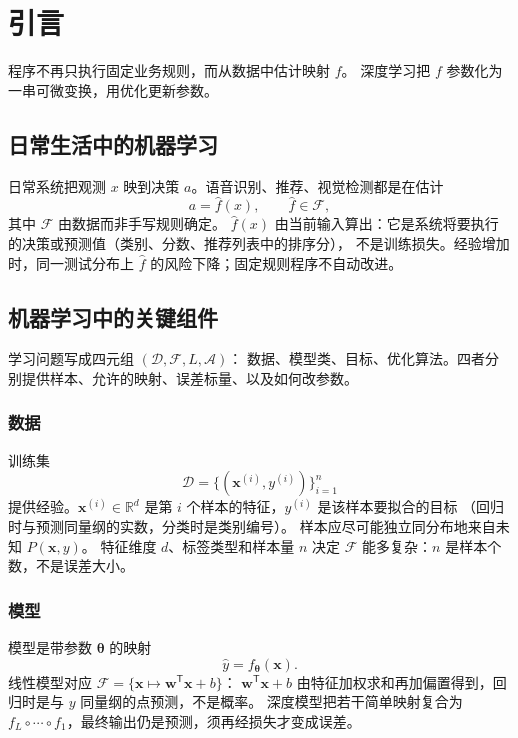 \chapter{引言}

程序不再只执行固定业务规则，而从数据中估计映射 $f$。
深度学习把 $f$ 参数化为一串可微变换，用优化更新参数。

\section{日常生活中的机器学习}

日常系统把观测 $x$ 映到决策 $a$。语音识别、推荐、视觉检测都是在估计
\[
a=\hat{f}(x),\qquad \hat{f}\in\mathcal{F},
\]
其中 $\mathcal{F}$ 由数据而非手写规则确定。
$\hat{f}(x)$ 由当前输入算出：它是系统将要执行的决策或预测值（类别、分数、推荐列表中的排序分），
不是训练损失。经验增加时，同一测试分布上 $\hat{f}$ 的风险下降；固定规则程序不自动改进。

\section{机器学习中的关键组件}

学习问题写成四元组 $(\mathcal{D},\mathcal{F},L,\mathcal{A})$：
数据、模型类、目标、优化算法。四者分别提供样本、允许的映射、误差标量、以及如何改参数。

\subsection{数据}

训练集
\[
\mathcal{D}=\{(\bm{x}^{(i)},y^{(i)})\}_{i=1}^{n}
\]
提供经验。$\bm{x}^{(i)}\in\mathbb{R}^{d}$ 是第 $i$ 个样本的特征，$y^{(i)}$ 是该样本要拟合的目标
（回归时与预测同量纲的实数，分类时是类别编号）。
样本应尽可能独立同分布地来自未知 $P(\bm{x},y)$。
特征维度 $d$、标签类型和样本量 $n$ 决定 $\mathcal{F}$ 能多复杂：$n$ 是样本个数，不是误差大小。

\subsection{模型}

模型是带参数 $\bm{\theta}$ 的映射
\[
\hat{y}=f_{\bm{\theta}}(\bm{x}).
\]
线性模型对应 $\mathcal{F}=\{\bm{x}\mapsto \bm{w}^{\mathsf T}\bm{x}+b\}$：
$\bm{w}^{\mathsf T}\bm{x}+b$ 由特征加权求和再加偏置得到，回归时是与 $y$ 同量纲的点预测，不是概率。
深度模型把若干简单映射复合为 $f_L\circ\cdots\circ f_1$，最终输出仍是预测，须再经损失才变成误差。

